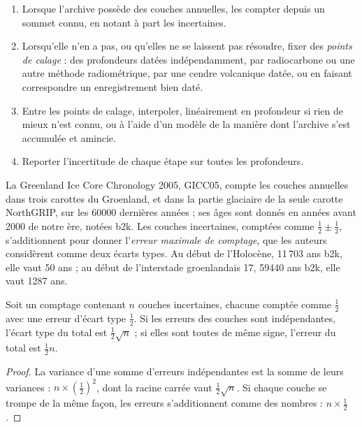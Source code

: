 \begin{method}\label{met:b2:climate-proxies:age-model}
\begin{enumerate}
  \item Lorsque l'archive possède des couches annuelles, les compter depuis un sommet connu, en notant à part
        les incertaines.
  \item Lorsqu'elle n'en a pas, ou qu'elles ne se laissent pas résoudre, fixer des \emph{points de calage} : des profondeurs
        datées indépendamment, par radiocarbone ou une autre méthode radiométrique, par une cendre volcanique datée, ou en
        faisant correspondre un enregistrement bien daté.
  \item Entre les points de calage, interpoler, linéairement en profondeur si rien de mieux n'est connu, ou à l'aide
        d'un modèle de la manière dont l'archive s'est accumulée et amincie.
  \item Reporter l'incertitude de chaque étape sur toutes les profondeurs.
\end{enumerate}
\end{method}

La Greenland Ice Core Chronology 2005, GICC05, compte les couches annuelles dans trois carottes du Groenland, et
dans la partie glaciaire de la seule carotte NorthGRIP, sur les \num{60000} dernières années ; ses âges sont
donnés en années avant 2000 de notre ère, notées b2k. Les couches incertaines, comptées comme $\frac12 \pm \frac12$,
s'additionnent pour donner l'\emph{erreur maximale de comptage}, que les auteurs
considèrent comme deux écarts types. Au début de l'Holocène, 11\,703 ans b2k, elle vaut 50 ans ;
au début de l'interstade groenlandais 17, \num{59440} ans b2k, elle vaut \num{1287} ans.

\begin{proposition}\label{prop:b2:climate-proxies:counting}
Soit un comptage contenant $n$ couches incertaines, chacune comptée comme $\frac12$ avec une erreur d'écart type
$\frac12$. Si les erreurs des couches sont indépendantes, l'écart type du total est
$\frac12\sqrt{n}$ ; si elles sont toutes de même signe, l'erreur du total est
$\frac12 n$.
\end{proposition}

\begin{proof}
La variance d'une somme d'erreurs indépendantes est la somme de leurs variances : $n \times
(\frac12)^2$, dont la racine carrée vaut $\frac12\sqrt{n}$. Si chaque couche se trompe de la même façon, les
erreurs s'additionnent comme des nombres : $n \times \frac12$.
\end{proof}

